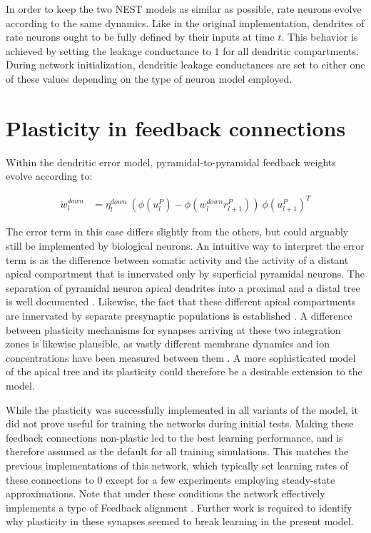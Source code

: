 In order to keep the two NEST models as similar as possible, rate neurons evolve according to the same dynamics. Like in
the original implementation, dendrites of rate neurons ought to be fully defined by their inputs at time $t$. This
behavior is achieved by setting the leakage conductance to $1$ for all dendritic compartments. During network
initialization, dendritic leakage conductances are set to either one of these values depending on the type of neuron
model employed.


\section{Plasticity in feedback connections}\label{sec-feedback-plast}

Within the dendritic error model, pyramidal-to-pyramidal feedback weights evolve according to:

\begin{align}
  \dot{w}_{l}^{down} & = \eta_l^{down} \ ( \phi(u_l^{P}) - \phi(w_l^{down} r_{l+1}^P) )\ \phi(u_{l+1}^{P})^T
\end{align}

The error term in this case differs slightly from the others, but could arguably still be implemented by biological
neurons. An intuitive way to interpret the error term is as the difference between somatic activity and the activity of
a distant apical compartment that is innervated only by superficial pyramidal neurons. The separation of pyramidal
neuron apical dendrites into a proximal and a distal tree is well documented \citep{Ishizuka1995}. Likewise, the fact
that these different apical compartments are innervated by separate presynaptic populations is established
\citep{Larkum2018}. A difference between plasticity mechanisms for synapses arriving at these two integration zones is
likewise plausible, as vastly different membrane dynamics and ion concentrations have been measured between them
\citep{Ishizuka1995,Larkum2009}. A more sophisticated model of the apical tree and its plasticity could therefore be a
desirable extension to the model.

While the plasticity was successfully implemented in all variants of the model, it did not prove useful for training the
networks during initial tests. Making these feedback connections non-plastic led to the best learning performance, and
is therefore assumed as the default for all training simulations. This matches the previous implementations of this
network, which typically set learning rates of these connections to $0$ except for a few experiments employing
steady-state approximations. Note that under these conditions the network effectively implements a type of Feedback
alignment \citep{Lillicrap2014}. Further work is required to identify why plasticity in these synapses seemed to break
learning in the present model.

